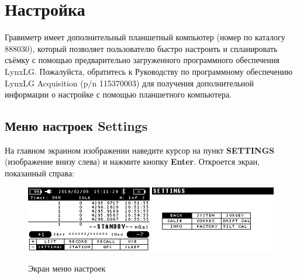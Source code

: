 \chapter[Настройка]{Настройка \cg{}}
\label{chap:setting_up_your_cg6_autograv}

Гравиметр \cg{} имеет дополнительный планшетный компьютер (номер по каталогу
888030), который позволяет пользователю быстро настроить и спланировать съёмку с
помощью предварительно загруженного программного обеспечения LynxLG.
Пожалуйста, обратитесь к Руководству по программному обеспечению LynxLG
Acquisition (p/n 115370003) для получения дополнительной информации о настройке
с помощью планшетного компьютера.


\section{Меню настроек Settings}

На главном экранном изображении наведите курсор на пункт \textbf{SETTINGS}
(изображение внизу слева) и нажмите кнопку \textbf{Enter}. Откроется экран,
показанный справа:

\begin{figure}[H]
  \centering
  \includegraphics[width=0.49\textwidth]{figures/the_settings_screen_1}
  \includegraphics[width=0.49\textwidth]{figures/the_settings_screen_2}
  \caption{Экран меню настроек}
  \label{fig:the_settings_screen}
\end{figure}

